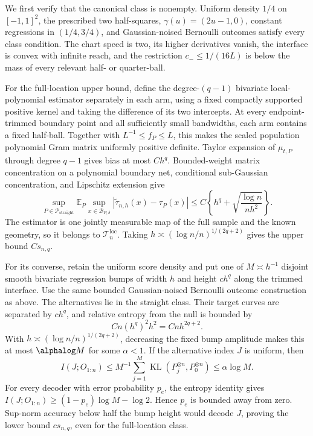 We first verify that the canonical class is nonempty.  Uniform density \(1/4\) on \([-1,1]^2\), the prescribed two half-squares, \(\gamma(u)=(2u-1,0)\), constant regressions in \((1/4,3/4)\), and Gaussian-noised Bernoulli outcomes satisfy every class condition.  The chart speed is two, its higher derivatives vanish, the interface is convex with infinite reach, and the restriction \(c_{-}\leq1/(16L)\) is below the mass of every relevant half- or quarter-ball.

For the full-location upper bound, define the degree-\((q-1)\) bivariate local-polynomial estimator separately in each arm, using a fixed compactly supported positive kernel and taking the difference of its two intercepts.  At every endpoint-trimmed boundary point and all sufficiently small bandwidths, each arm contains a fixed half-ball.  Together with \(L^{-1}\leq f_P\leq L\), this makes the scaled population polynomial Gram matrix uniformly positive definite.  Taylor expansion of \(\mu_{t,P}\) through degree \(q-1\) gives bias at most \(Ch^q\).  Bounded-weight matrix concentration on a polynomial boundary net, conditional sub-Gaussian concentration, and Lipschitz extension give
\[
\sup_{P\in\mathcal P_{\mathrm{straight}}}
\mathbb E_P\sup_{x\in\mathcal B_{P,\delta}}
|\widetilde\tau_{n,h}(x)-\tau_P(x)|
\leq C\left\{h^q+\sqrt{\frac{\log n}{nh^2}}\right\}.
\]
The estimator is one jointly measurable map of the full sample and the known geometry, so it belongs to \(\mathcal T_n^{\mathrm{loc}}\).  Taking \(h\asymp(\log n/n)^{1/(2q+2)}\) gives the upper bound \(Cs_{n,q}\).

For its converse, retain the uniform score density and put one of \(M\asymp h^{-1}\) disjoint smooth bivariate regression bumps of width \(h\) and height \(c h^q\) along the trimmed interface.  Use the same bounded Gaussian-noised Bernoulli outcome construction as above.  The alternatives lie in the straight class.  Their target curves are separated by \(ch^q\), and relative entropy from the null is bounded by
\[
C n(h^q)^2h^2=Cnh^{2q+2}.
\]
With \(h\asymp(\log n/n)^{1/(2q+2)}\), decreasing the fixed bump amplitude makes this at most \(\alphalog M\) for some \(\alpha<1\).  If the alternative index \(J\) is uniform, then
\[
I(J;O_{1:n})
\leq M^{-1}\sum_{j=1}^M\operatorname{KL}(P_j^{\otimes n},P_0^{\otimes n})
\leq\alpha\log M.
\]
For every decoder with error probability \(p_e\), the entropy identity gives
\(I(J;O_{1:n})\geq(1-p_e)\log M-\log2\).  Hence \(p_e\) is bounded away from zero.  Sup-norm accuracy below half the bump height would decode \(J\), proving the lower bound \(cs_{n,q}\), even for the full-location class.

